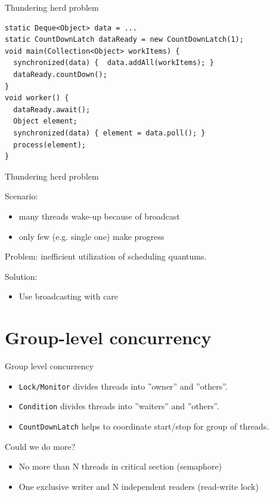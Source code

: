 \begin{frame}{Thundering herd problem}

\begin{verbatim}
static Deque<Object> data = ...
static CountDownLatch dataReady = new CountDownLatch(1);
void main(Collection<Object> workItems) {
  synchronized(data) {  data.addAll(workItems); }
  dataReady.countDown();
}
void worker() {
  dataReady.await();
  Object element;
  synchronized(data) { element = data.poll(); }
  process(element);
}
\end{verbatim}
\end{frame}

\begin{frame}{Thundering herd problem}

    Scenario:
    \begin{itemize}
        \item many threads wake-up because of broadcast 
        \item only few (e.g. single one) make progress
    \end{itemize}

    Problem: inefficient utilization of scheduling quantums.

    Solution:
    \begin{itemize}
        \item Use broadcasting with care
    \end{itemize}
\end{frame}


\section{Group-level concurrency}
\showTOC

\begin{frame}{Group level concurrency}

\begin{itemize}
    \item \texttt{Lock/Monitor} divides threads into ''owner'' and ''others''.
    \item \texttt{Condition} divides threads into ''waiters'' and ''others''.
    \item \texttt{CountDownLatch} helps to coordinate start/stop for group of threads.
\end{itemize}

Could we do more?

\begin{itemize}
    \pause \item No more than N threads in critical section \pause (semaphore)
    \pause \item One exclusive writer and N independent readers \pause (read-write lock)
\end{itemize}
\end{frame}


